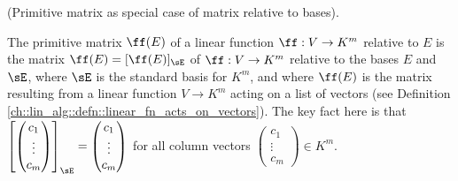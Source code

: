 \begin{remark}
\label{ch::lin_alg::rmk::primitive_matrix_as_matrix_wrt_bases}

    (Primitive matrix as special case of matrix relative to bases). 
    
    The primitive matrix $\ff(E)$ of a linear function $\ff:V \rightarrow K^m$ relative to $E$ is the matrix $\ff(E) = [\ff(E)]_{\sE}$ of $\ff:V \rightarrow K^m$ relative to the bases $E$ and $\sE$, where $\sE$ is the standard basis for $K^m$, and where $\ff(E)$ is the matrix resulting from a linear function $V \rightarrow K^m$ acting on a list of vectors (see Definition \ref{ch::lin_alg::defn::linear_fn_acts_on_vectors}). The key fact here is that $\left[\begin{pmatrix} c_1 \\ \vdots \\ c_m \end{pmatrix}\right]_\sE = \begin{pmatrix} c_1 \\ \vdots \\ c_m \end{pmatrix}$ for all column vectors $\begin{pmatrix} c_1 \\ \vdots \\ c_m \end{pmatrix} \in K^m$.
\end{remark}
